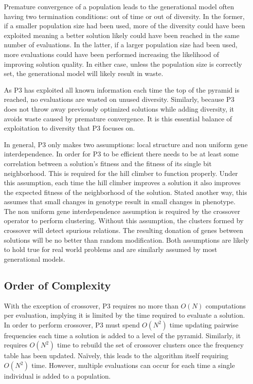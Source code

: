 \documentclass{sig-alternate}
\begin{document}
Premature convergence of a population leads to the generational model
often having two termination conditions: out of time or out of
diversity.  In the former, if a smaller population size had been used,
more of the diversity could have been exploited meaning a better
solution likely could have been reached in the same number of
evaluations.  In the latter, if a larger population size had been
used, more evaluations could have been performed increasing the
likelihood of improving solution quality.  In
either case, unless the population size is correctly set, the
generational model will likely result in waste.

As P3 has exploited all known information each time the top of the pyramid is reached,
no evaluations are wasted  on unused diversity.  Similarly, because P3
does not throw away previously optimized solutions while adding diversity, it avoids
waste caused by premature convergence. It is this essential balance of
exploitation to diversity that P3 focuses on.

In general, P3 only makes two assumptions: local structure and non uniform gene interdependence.
In order for P3 to be efficient there needs to be at least some correlation between a
solution's fitness and the fitness of its single bit neighborhood.  This is required for
the hill climber to function properly.  Under this assumption, each time the hill climber
improves a solution it also improves the expected fitness of the neighborhood of the solution.
Stated another way, this assumes that small changes in genotype result in small changes in phenotype.
The non uniform gene interdependence assumption is required by the crossover operator to
perform clustering.  Without this assumption, the clusters formed by crossover will
detect spurious relations. The resulting donation of genes between solutions will be
no better than random modification.  Both assumptions are likely to hold true for
real world problems and are similarly assumed by most generational models.

\subsection{Order of Complexity}
With the exception of crossover, P3 requires no more than $O(N)$ computations
per evaluation, implying it is limited by the time required to evaluate a solution.
In order to perform crossover, P3 must spend $O(N^2)$ time updating pairwise
frequencies each time a solution is added to a level of the pyramid.  Similarly,
it requires $O(N^2)$ time to rebuild the set of crossover clusters once the frequency
table has been updated.  Na\"ively, this leads to the algorithm itself requiring $O(N^2)$ time.
However, multiple evaluations can occur for each time a single individual is added
to a population.
\end{document}
